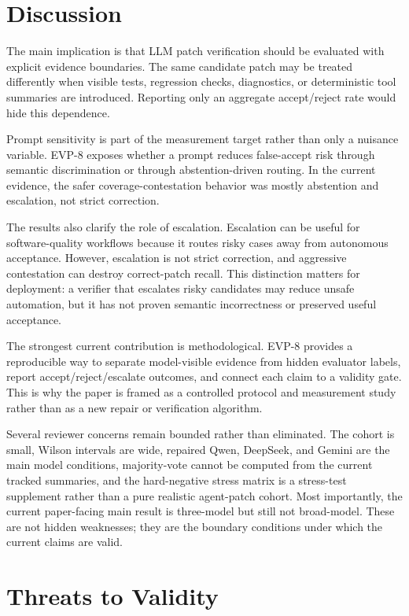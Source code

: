 \documentclass[conference]{IEEEtran}
\begin{document}
\section{Discussion}

The main implication is that LLM patch verification should be evaluated with explicit evidence boundaries. The same candidate patch may be treated differently when visible tests, regression checks, diagnostics, or deterministic tool summaries are introduced. Reporting only an aggregate accept/reject rate would hide this dependence.

Prompt sensitivity is part of the measurement target rather than only a nuisance variable. EVP-8 exposes whether a prompt reduces false-accept risk through semantic discrimination or through abstention-driven routing. In the current evidence, the safer coverage-contestation behavior was mostly abstention and escalation, not strict correction.

The results also clarify the role of escalation. Escalation can be useful for software-quality workflows because it routes risky cases away from autonomous acceptance. However, escalation is not strict correction, and aggressive contestation can destroy correct-patch recall. This distinction matters for deployment: a verifier that escalates risky candidates may reduce unsafe automation, but it has not proven semantic incorrectness or preserved useful acceptance.

The strongest current contribution is methodological. EVP-8 provides a reproducible way to separate model-visible evidence from hidden evaluator labels, report accept/reject/escalate outcomes, and connect each claim to a validity gate. This is why the paper is framed as a controlled protocol and measurement study rather than as a new repair or verification algorithm.

Several reviewer concerns remain bounded rather than eliminated. The cohort is small, Wilson intervals are wide, repaired Qwen, DeepSeek, and Gemini are the main model conditions, majority-vote cannot be computed from the current tracked summaries, and the hard-negative stress matrix is a stress-test supplement rather than a pure realistic agent-patch cohort. Most importantly, the current paper-facing main result is three-model but still not broad-model. These are not hidden weaknesses; they are the boundary conditions under which the current claims are valid.

\section{Threats to Validity}
\end{document}
